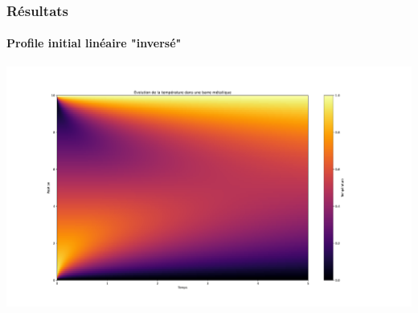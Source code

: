 \documentclass{beamer}
\begin{document}
    \begin{frame}
    \frametitle{Résultats}
    \framesubtitle{Profile initial linéaire "inversé"}

    \begin{center}
    \includegraphics[width=1.2\linewidth]{figs/Figure_5.pdf}
    \end{center}


    \end{frame}
\end{document}
